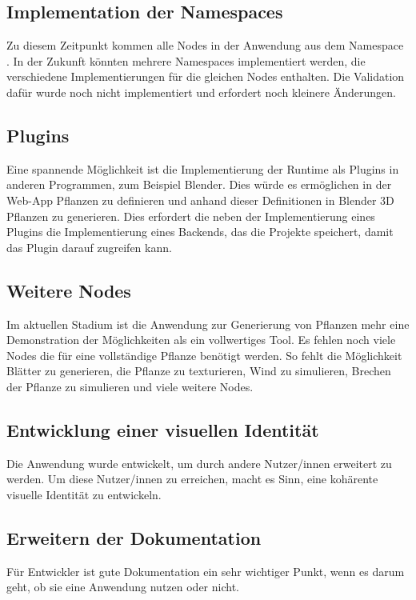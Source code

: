 \documentclass[ngerman]{article}
\begin{document}
\subsection*{Implementation der Namespaces}
Zu diesem Zeitpunkt kommen alle Nodes in der Anwendung aus dem Namespace . In der Zukunft könnten mehrere Namespaces implementiert werden, die verschiedene Implementierungen für die gleichen Nodes enthalten. Die Validation dafür wurde noch nicht implementiert und erfordert noch kleinere Änderungen.

\subsection*{Plugins}
Eine spannende Möglichkeit ist die Implementierung der Runtime als Plugins in anderen Programmen, zum Beispiel Blender. Dies würde es ermöglichen in der Web-App Pflanzen zu definieren und anhand dieser Definitionen in Blender 3D Pflanzen zu generieren. Dies erfordert die neben der Implementierung eines Plugins die Implementierung eines Backends, das die Projekte speichert, damit das Plugin darauf zugreifen kann.

\subsection*{Weitere Nodes}
Im aktuellen Stadium ist die Anwendung zur Generierung von Pflanzen mehr eine Demonstration der Möglichkeiten als ein vollwertiges Tool. Es fehlen noch viele Nodes die für eine vollständige Pflanze benötigt werden. So fehlt die Möglichkeit Blätter zu generieren, die Pflanze zu texturieren, Wind zu simulieren, Brechen der Pflanze zu simulieren und viele weitere Nodes.

\subsection*{Entwicklung einer visuellen Identität}
Die Anwendung wurde entwickelt, um durch andere Nutzer/innen erweitert zu werden. 
Um diese Nutzer/innen zu erreichen, macht es Sinn, eine kohärente visuelle Identität zu entwickeln.

\subsection*{Erweitern der Dokumentation}
Für Entwickler ist gute Dokumentation ein sehr wichtiger Punkt, wenn es darum geht, ob sie eine Anwendung nutzen oder nicht. 
\end{document}
